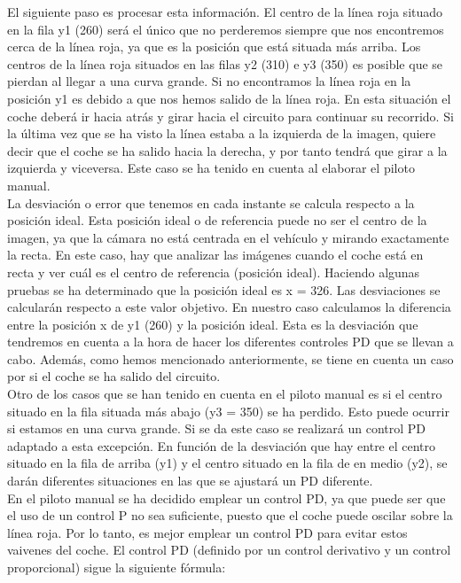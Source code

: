 El siguiente paso es procesar esta información. El centro de la línea roja situado en la fila y1 (260) será el único que no perderemos siempre que nos encontremos cerca de la línea roja, ya que es la posición que está situada más arriba. Los centros de la línea roja situados en las filas y2 (310) e y3 (350) es posible que se pierdan al llegar a una curva grande. Si no encontramos la línea roja en la posición y1 es debido a que nos hemos salido de la línea roja. En esta situación el coche deberá ir hacia atrás y girar hacia el circuito para continuar su recorrido. Si la última vez que se ha visto la línea estaba a la izquierda de la imagen, quiere decir que el coche se ha salido hacia la derecha, y por tanto tendrá que girar a la izquierda y viceversa. Este caso se ha tenido en cuenta al elaborar el piloto manual.\\

La desviación o error que tenemos en cada instante se calcula respecto a la posición ideal. Esta posición ideal o de referencia puede no ser el centro de la imagen, ya que la cámara no está centrada en el vehículo y mirando exactamente la recta. En este caso, hay que analizar las imágenes cuando el coche está en recta y ver cuál es el centro de referencia (posición ideal). Haciendo algunas pruebas se ha determinado que la posición ideal es x = 326. Las desviaciones se calcularán respecto a este valor objetivo. En nuestro caso calculamos la diferencia entre la posición x de y1 (260) y la posición ideal. Esta es la desviación que tendremos en cuenta a la hora de hacer los diferentes controles PD que se llevan a cabo. Además, como hemos mencionado anteriormente, se tiene en cuenta un caso por si el coche se ha salido del circuito.\\

Otro de los casos que se han tenido en cuenta en el piloto manual es si el centro situado en la fila situada más abajo (y3 = 350) se ha perdido. Esto puede ocurrir si estamos en una curva grande. Si se da este caso se realizará un control PD adaptado a esta excepción. En función de la desviación que hay entre el centro situado en la fila de arriba (y1) y el centro situado en la fila de en medio (y2), se darán diferentes situaciones en las que se ajustará un PD diferente.\\

En el piloto manual se ha decidido emplear un control PD, ya que puede ser que el uso de un control P no sea suficiente, puesto que el coche puede oscilar sobre la línea roja. Por lo tanto, es mejor emplear un control PD para evitar estos vaivenes del coche. El control PD (definido por un control derivativo y un control proporcional) sigue la siguiente fórmula:\\

